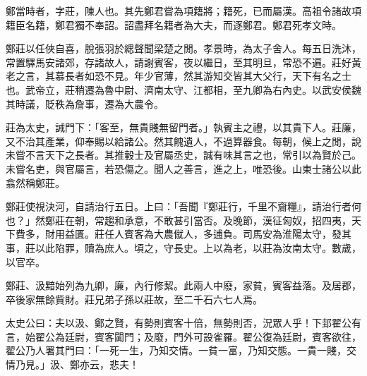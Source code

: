 \begin{pinyinscope}
鄭當時者，字莊，陳人也。其先鄭君嘗為項籍將；籍死，已而屬漢。高祖令諸故項籍臣名籍，鄭君獨不奉詔。詔盡拜名籍者為大夫，而逐鄭君。鄭君死孝文時。

鄭莊以任俠自喜，脫張羽於緦聲聞梁楚之閒。孝景時，為太子舍人。每五日洗沐，常置驛馬安諸郊，存諸故人，請謝賓客，夜以繼日，至其明旦，常恐不遍。莊好黃老之言，其慕長者如恐不見。年少官薄，然其游知交皆其大父行，天下有名之士也。武帝立，莊稍遷為魯中尉、濟南太守、江都相，至九卿為右內史。以武安侯魏其時議，貶秩為詹事，遷為大農令。

莊為太史，誡門下：「客至，無貴賤無留門者。」執賓主之禮，以其貴下人。莊廉，又不治其產業，仰奉賜以給諸公。然其餽遺人，不過算器食。每朝，候上之閒，說未嘗不言天下之長者。其推轂士及官屬丞史，誠有味其言之也，常引以為賢於己。未嘗名吏，與官屬言，若恐傷之。聞人之善言，進之上，唯恐後。山東士諸公以此翕然稱鄭莊。

鄭莊使視決河，自請治行五日。上曰：「吾聞『鄭莊行，千里不齎糧』，請治行者何也？」然鄭莊在朝，常趨和承意，不敢甚引當否。及晚節，漢征匈奴，招四夷，天下費多，財用益匱。莊任人賓客為大農僦人，多逋負。司馬安為淮陽太守，發其事，莊以此陷罪，贖為庶人。頃之，守長史。上以為老，以莊為汝南太守。數歲，以官卒。

鄭莊、汲黯始列為九卿，廉，內行修絜。此兩人中廢，家貧，賓客益落。及居郡，卒後家無餘貲財。莊兄弟子孫以莊故，至二千石六七人焉。

太史公曰：夫以汲、鄭之賢，有勢則賓客十倍，無勢則否，況眾人乎！下邽翟公有言，始翟公為廷尉，賓客闐門；及廢，門外可設雀羅。翟公復為廷尉，賓客欲往，翟公乃人署其門曰：「一死一生，乃知交情。一貧一富，乃知交態。一貴一賤，交情乃見。」汲、鄭亦云，悲夫！


\end{pinyinscope}